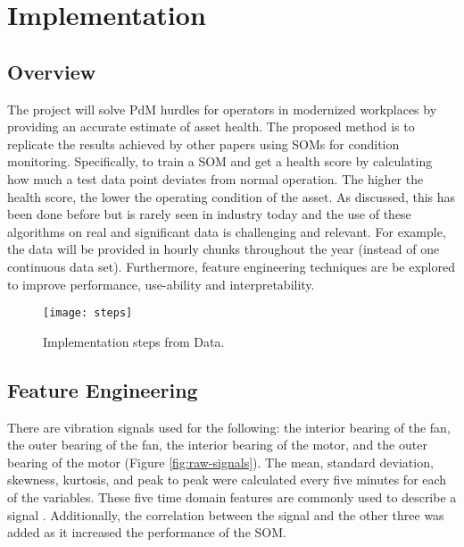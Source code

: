 \section{Implementation}
\subsection{Overview}
The project will solve PdM hurdles for operators in modernized workplaces by providing an accurate estimate of asset health.
The proposed method is to replicate the results achieved by other papers using SOMs for condition monitoring. 
Specifically, to train a SOM and get a health score by calculating how much a test data point deviates from normal operation.
The higher the health score, the lower the operating condition of the asset.
As discussed, this has been done before but is rarely seen in industry today and the use of these algorithms on real and significant data is challenging and relevant.
For example, the data will be provided in hourly chunks throughout the year (instead of one continuous data set).
Furthermore, feature engineering techniques are be explored to improve performance, use-ability and interpretability.
\begin{figure}[!h]
    \texttt{[image: steps]}
    \centering
    \label{fig:steps}
    \caption{Implementation steps from Data.}
\end{figure}

\subsection{Feature Engineering}
There are vibration signals used for the following: the interior bearing of the fan, 
the outer bearing of the fan, 
the interior bearing of the motor, and
the outer bearing of the motor (Figure \ref{fig:raw-signals}). 
The mean, standard deviation, skewness, kurtosis, and peak to peak were calculated every five minutes for each of the variables.
These five time domain features are commonly used to describe a signal \cite{Tian2014AnomalyDU}.
Additionally, the correlation between the signal and the other three was added as it increased the performance of the SOM.

